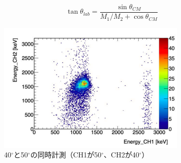 \begin{equation}
    \tan \theta_{lab} = \frac{\sin \theta_{CM}}{M_1/M_2 + \cos {\theta_{CM}}}
\end{equation}


\begin{figure}[H]
\centering
\includegraphics[width=90mm]{picture/jan/4050.png}
\caption{40$^{\circ}$と50$^{\circ}$の同時計測（CH1が50$^\circ$、CH2が40$^\circ$）}
\label{4050}
\end{figure}